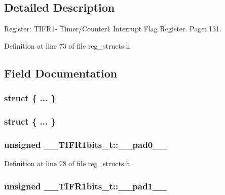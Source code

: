 \subsection{Detailed Description}
Register\+: T\+I\+F\+R1-\/ Timer/\+Counter1 Interrupt Flag Register. Page\+: 131. 

Definition at line 73 of file reg\+\_\+structs.\+h.



\subsection{Field Documentation}
\hypertarget{union_____t_i_f_r1bits__t_a561b5db6d3b99776551de74afc655c92}{\subsubsection[{"@13}]{\setlength{\rightskip}{0pt plus 5cm}struct \{ ... \} }}\label{union_____t_i_f_r1bits__t_a561b5db6d3b99776551de74afc655c92}
\hypertarget{union_____t_i_f_r1bits__t_a4628bac7d1c862b16ae4cc0f948917d7}{\subsubsection[{"@15}]{\setlength{\rightskip}{0pt plus 5cm}struct \{ ... \} }}\label{union_____t_i_f_r1bits__t_a4628bac7d1c862b16ae4cc0f948917d7}
\hypertarget{union_____t_i_f_r1bits__t_a5b9b27ff6d2a5313311e2e89ef07c466}{
\subsubsection[{\+\_\+\+\_\+pad0\+\_\+\+\_\+}]{\setlength{\rightskip}{0pt plus 5cm}unsigned \+\_\+\+\_\+\+T\+I\+F\+R1bits\+\_\+t\+::\+\_\+\+\_\+pad0\+\_\+\+\_\+}}\label{union_____t_i_f_r1bits__t_a5b9b27ff6d2a5313311e2e89ef07c466}


Definition at line 78 of file reg\+\_\+structs.\+h.

\hypertarget{union_____t_i_f_r1bits__t_ad2d26dfffd8d2cbbc70778514e0dc787}{
\subsubsection[{\+\_\+\+\_\+pad1\+\_\+\+\_\+}]{\setlength{\rightskip}{0pt plus 5cm}unsigned \+\_\+\+\_\+\+T\+I\+F\+R1bits\+\_\+t\+::\+\_\+\+\_\+pad1\+\_\+\+\_\+}}\label{union_____t_i_f_r1bits__t_ad2d26dfffd8d2cbbc70778514e0dc787}



